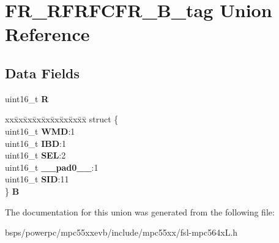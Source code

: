 \hypertarget{unionFR__RFRFCFR__16B__tag}{}\section{F\+R\+\_\+\+R\+F\+R\+F\+C\+F\+R\+\_\+B\+\_\+tag Union Reference}
\label{unionFR__RFRFCFR__16B__tag}
\subsection*{Data Fields}
\begin{DoxyCompactItemize}
\item 
\mbox{\label{unionFR__RFRFCFR__16B__tag_ab3e9cd2d9be8e2912cb09671311e33d1}} 
uint16\+\_\+t {\bfseries R}
\item 
\mbox{\label{unionFR__RFRFCFR__16B__tag_a6f2cc0963b8dbbfcfe172000db3209e2}} 
\begin{tabbing}
xx\=xx\=xx\=xx\=xx\=xx\=xx\=xx\=xx\=\kill
struct \{\\
\>uint16\_t {\bfseries WMD}:1\\
\>uint16\_t {\bfseries IBD}:1\\
\>uint16\_t {\bfseries SEL}:2\\
\>uint16\_t {\bfseries \_\_pad0\_\_}:1\\
\>uint16\_t {\bfseries SID}:11\\
\} {\bfseries B}\\

\end{tabbing}\end{DoxyCompactItemize}


The documentation for this union was generated from the following file\+:\begin{DoxyCompactItemize}
\item 
bsps/powerpc/mpc55xxevb/include/mpc55xx/fsl-\/mpc564x\+L.\+h\end{DoxyCompactItemize}
